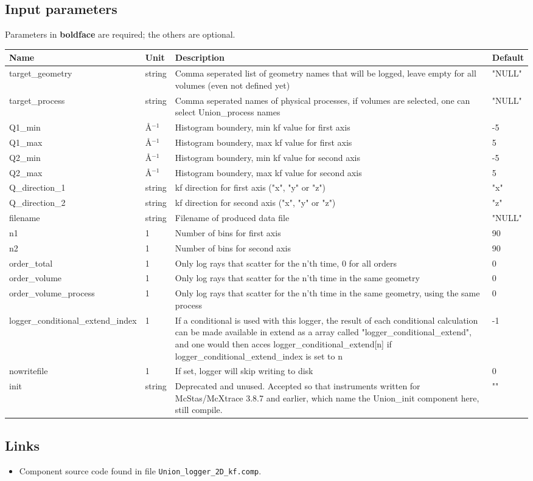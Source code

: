 \subsection*{Input parameters}
Parameters in \textbf{boldface} are required; the others are optional.

\begin{longtable}{p{}p{}p{}p{}}
\toprule
\textbf{Name} & \textbf{Unit} & \textbf{Description} & \textbf{Default} \\
\midrule
\endhead
target\_geometry & string & Comma seperated list of geometry names that will be logged, leave empty for all volumes (even not defined yet) & "NULL" \\
target\_process & string & Comma seperated names of physical processes, if volumes are selected, one can select Union\_process names & "NULL" \\
Q1\_min & \AA{}$^{-1}$ & Histogram boundery, min kf value for first axis & -5 \\
Q1\_max & \AA{}$^{-1}$ & Histogram boundery, max kf value for first axis & 5 \\
Q2\_min & \AA{}$^{-1}$ & Histogram boundery, min kf value for second axis & -5 \\
Q2\_max & \AA{}$^{-1}$ & Histogram boundery, max kf value for second axis & 5 \\
Q\_direction\_1 & string & kf direction for first axis ("x", "y" or "z") & "x" \\
Q\_direction\_2 & string & kf direction for second axis ("x", "y" or "z") & "z" \\
filename & string & Filename of produced data file & "NULL" \\
n1 & 1 & Number of bins for first axis & 90 \\
n2 & 1 & Number of bins for second axis & 90 \\
order\_total & 1 & Only log rays that scatter for the n'th time, 0 for all orders & 0 \\
order\_volume & 1 & Only log rays that scatter for the n'th time in the same geometry & 0 \\
order\_volume\_process & 1 & Only log rays that scatter for the n'th time in the same geometry, using the same process & 0 \\
logger\_conditional\_extend\_index & 1 & If a conditional is used with this logger, the result of each conditional calculation can be made available in extend as a array called "logger\_conditional\_extend", and one would then acces logger\_conditional\_extend[n] if logger\_conditional\_extend\_index is set to n & -1 \\
nowritefile & 1 & If set, logger will skip writing to disk & 0 \\
init & string & Deprecated and unused. Accepted so that instruments written for McStas/McXtrace 3.8.7 and earlier, which name the Union\_init component here, still compile. & "" \\
\bottomrule
\end{longtable}

\subsection*{Links}
\begin{itemize}
  \item Component source code found in file \texttt{Union\_logger\_2D\_kf.comp}.
\end{itemize}
